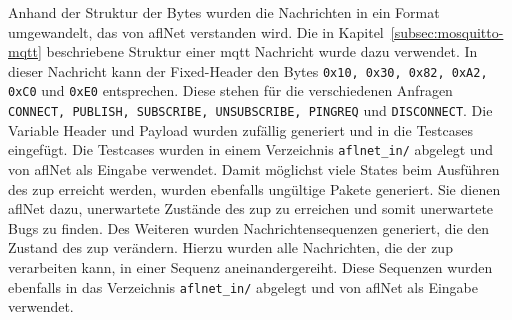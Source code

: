 Anhand der Struktur der Bytes wurden die Nachrichten in ein Format umgewandelt, das von \gls{afl}Net verstanden wird.
Die in Kapitel~\ref{subsec:mosquitto-mqtt} beschriebene Struktur einer \gls{mqtt} Nachricht wurde dazu verwendet.
In dieser Nachricht kann der Fixed-Header den Bytes \texttt{0x10, 0x30, 0x82, 0xA2, 0xC0} und \texttt{0xE0} entsprechen.
Diese stehen für die verschiedenen Anfragen \texttt{CONNECT, PUBLISH, SUBSCRIBE, UNSUBSCRIBE, PINGREQ} und \texttt{DISCONNECT}.
Die Variable Header und Payload wurden zufällig generiert und in die Testcases eingefügt.
Die Testcases wurden in einem Verzeichnis \texttt{aflnet\_in/} abgelegt und von \gls{afl}Net als Eingabe verwendet.
Damit möglichst viele States beim Ausführen des \gls{zup} erreicht werden, wurden ebenfalls ungültige Pakete generiert.
Sie dienen \gls{afl}Net dazu, unerwartete Zustände des \gls{zup} zu erreichen und somit unerwartete Bugs zu finden.
Des Weiteren wurden Nachrichtensequenzen generiert, die den Zustand des \gls{zup} verändern.
Hierzu wurden alle Nachrichten, die der \gls{zup} verarbeiten kann, in einer Sequenz aneinandergereiht.
Diese Sequenzen wurden ebenfalls in das Verzeichnis \texttt{aflnet\_in/} abgelegt und von \gls{afl}Net als Eingabe verwendet.
